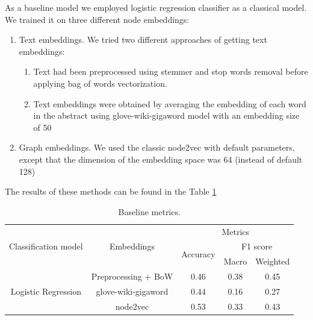 \documentclass{article}
\begin{document}
As a baseline model we employed logistic regression classifier as a classical model. We trained it on three different node embeddings:
\begin{enumerate}

\item[1.] Text embeddings. \newline
We tried two different approaches of getting text embeddings:
\begin{enumerate}
\item[a)] Text had been preprocessed using stemmer and stop words removal before applying bag of words vectorization.
\item[b)] Text embeddings were obtained by averaging the embedding of each word in the abstract using glove-wiki-gigaword model with an embedding size of 50
\end{enumerate}

\item[2.] Graph embeddings.\newline
We used the classic node2vec with default parameters, except that the dimension of the embedding space was 64 (instead of default 128)
\end{enumerate}

The results of these methods can be found in the Table \ref{table:baseline_metrics}

\begin{table}[h]
\centering
\begin{tabular}{c c  c c c}
\hline\hline
 & & \multicolumn{3}{c}{Metrics} \\
\cline{3-5}
Classification model & Embeddings & \multirow{2}{*}{Accuracy} & \multicolumn{2}{c}{F1 score} \\
 & & & Macro & Weighted \\
\hline
\multirow{3}{*}{Logistic Regression} & Preprocessing + BoW & 0.46 & 0.38 & 0.45 \\
 & glove-wiki-gigaword & 0.44 & 0.16 & 0.27 \\
 & node2vec & 0.53 & 0.33 & 0.43 \\
\hline
\end{tabular}
\caption{Baseline metrics.}
\label{table:baseline_metrics}
\end{table}
\end{document}
